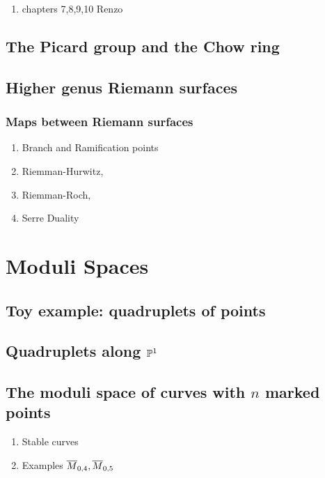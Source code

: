 \documentclass[12pt]{memoir}
\begin{document}
\begin{enumerate}
    \item chapters 7,8,9,10 Renzo
\end{enumerate}

\section{The Picard group and the Chow ring}

\section{Higher genus Riemann surfaces}

\subsection{Maps between Riemann surfaces}

\begin{enumerate}
    \item Branch and Ramification points
    \item Riemman-Hurwitz,
    \item Riemman-Roch,
    \item Serre Duality
\end{enumerate}
\fi
\chapter{Moduli Spaces}

\section{Toy example: quadruplets of points}

\section{Quadruplets along $\mathbb{P}^1$}

\section{The moduli space of curves with $n$ marked points}

\begin{enumerate}
    \item Stable curves
    \item Examples $\overline{M}_{0,4}, \overline{M}_{0,5}$ 
\end{enumerate}
\end{document}
